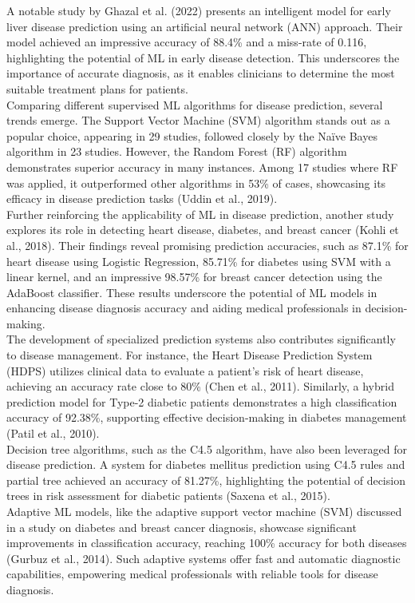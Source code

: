 \documentclass[11pt]{article}
\begin{document}
A notable study by Ghazal et al. (2022) presents an intelligent model for early liver disease prediction using an artificial neural network (ANN) approach. Their model achieved an impressive accuracy of 88.4\% and a miss-rate of 0.116, highlighting the potential of ML in early disease detection. This underscores the importance of accurate diagnosis, as it enables clinicians to determine the most suitable treatment plans for patients.\\
Comparing different supervised ML algorithms for disease prediction, several trends emerge. The Support Vector Machine (SVM) algorithm stands out as a popular choice, appearing in 29 studies, followed closely by the Naïve Bayes algorithm in 23 studies. However, the Random Forest (RF) algorithm demonstrates superior accuracy in many instances. Among 17 studies where RF was applied, it outperformed other algorithms in 53\% of cases, showcasing its efficacy in disease prediction tasks (Uddin et al., 2019).\\
Further reinforcing the applicability of ML in disease prediction, another study explores its role in detecting heart disease, diabetes, and breast cancer (Kohli et al., 2018). Their findings reveal promising prediction accuracies, such as 87.1\% for heart disease using Logistic Regression, 85.71\% for diabetes using SVM with a linear kernel, and an impressive 98.57\% for breast cancer detection using the AdaBoost classifier. These results underscore the potential of ML models in enhancing disease diagnosis accuracy and aiding medical professionals in decision-making.\\
The development of specialized prediction systems also contributes significantly to disease management. For instance, the Heart Disease Prediction System (HDPS) utilizes clinical data to evaluate a patient's risk of heart disease, achieving an accuracy rate close to 80\% (Chen et al., 2011). Similarly, a hybrid prediction model for Type-2 diabetic patients demonstrates a high classification accuracy of 92.38\%, supporting effective decision-making in diabetes management (Patil et al., 2010).\\
Decision tree algorithms, such as the C4.5 algorithm, have also been leveraged for disease prediction. A system for diabetes mellitus prediction using C4.5 rules and partial tree achieved an accuracy of 81.27\%, highlighting the potential of decision trees in risk assessment for diabetic patients (Saxena et al., 2015).\\
Adaptive ML models, like the adaptive support vector machine (SVM) discussed in a study on diabetes and breast cancer diagnosis, showcase significant improvements in classification accuracy, reaching 100\% accuracy for both diseases (Gurbuz et al., 2014). Such adaptive systems offer fast and automatic diagnostic capabilities, empowering medical professionals with reliable tools for disease diagnosis.\\
\end{document}

